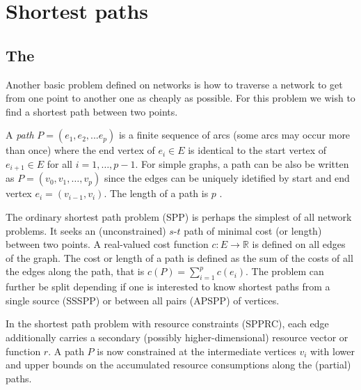 \chapter{Shortest paths}\label{ch:4}

\section{The \spprc{}}
Another basic problem defined on networks is how to traverse a network to get from one point to another one as cheaply as possible. For this problem we wish to find a shortest path between two points.

\begin{definition}[path]
A \textit{path} $P = (e_1, e_2, ... e_p)$ is a finite sequence of arcs (some arcs may occur more than once) where the end vertex of $e_i \in E$ is identical to the start vertex of $e_{i+1} \in E$ for all $i=1,\dots,p-1$. For simple graphs, a path can be also be written as $P = (v_0,v_1,\dots,v_p)$ since the edges can be uniquely idetified by start and end vertex $e_i=(v_{i-1},v_i)$. The length of a path is $p$ \cite{irnich2005shortest}.
\end{definition}


\begin{definition}[SPP]
The ordinary shortest path problem (SPP) is perhaps the simplest of all network problems. It seeks an (unconstrained) $s$-$t$ path of minimal cost (or length) between two points. A real-valued cost function $c : E \rightarrow \mathbb{R}$ is defined on all edges of the graph. The cost or length of a path is defined as the sum of the costs of all the edges along the path, that is $c(P)=\sum_{i=1}^p c(e_i)$. The problem can further be split depending if one is interested to know shortest paths from a single source (SSSPP) or between all pairs (APSPP) of vertices.
\end{definition}

\begin{definition}[SPPRC]
In the shortest path problem with resource constraints (SPPRC), each edge additionally carries a secondary (possibly higher-dimensional) resource vector or function $r$. A path $P$ is now constrained at the intermediate vertices $v_i$ with lower and upper bounds on the accumulated resource consumptions along the (partial) paths.
\end{definition}

